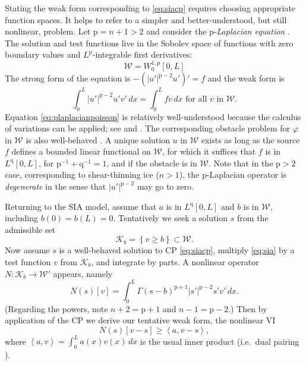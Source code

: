 \documentclass[letterpaper,final,12pt,reqno]{amsart}
\theoremstyle{claim}
\newcommand{\ip}[2]{\left<#1,#2\right>}
\newcommand{\pp}{{\text{p}}}
\newcommand{\qq}{{\text{q}}}
\numberwithin{equation}{section}
\numberwithin{figure}{section}
\numberwithin{table}{section}
\numberwithin{theorem}{section}
\begin{document}
Stating the weak form corresponding to \eqref{eq:siacp} requires choosing appropriate function spaces.  It helps to refer to a simpler and better-understood, but still nonlinear, problem.  Let $\pp=n+1>2$ and consider the $\pp$-\emph{Laplacian equation} \cite{Ciarlet2002,DiBenedetto2012}.  The solution and test functions live in the Sobolev space of functions with zero boundary values and $L^\pp$-integrable first derivatives:
\begin{equation}
\mathcal{W} = W_0^{1,\pp}[0,L]  \label{eq:defineW}
\end{equation}
The strong form of the equation is $-(|u'|^{\pp-2} u')' = f$ and the weak form is
\begin{equation}
\int_0^L |u'|^{\pp-2} u' v'\,dx = \int_0^L f v\,dx \text{ for all $v$ in $\mathcal{W}$.}  \label{eq:plaplacianpoisson}
\end{equation}
Equation \eqref{eq:plaplacianpoisson} is relatively well-understood because the calculus of variations can be applied; see \cite[section 5.3]{Ciarlet2002} and \cite{BarrettLiu1993}.  The corresponding obstacle problem for $\varphi$ in $\mathcal{W}$ is also well-behaved \cite{ChoeLewis1991}.  A unique solution $u$ in $\mathcal{W}$ exists as long as the source $f$ defines a bounded linear functional on $\mathcal{W}$, for which it suffices that $f$ is in $L^\qq[0,L]$, for $\pp^{-1}+\qq^{-1}=1$, and if the obstacle is in $\mathcal{W}$.  Note that in the $\pp>2$ case, corresponding to shear-thinning ice ($n>1$), the $\pp$-Laplacian operator is \emph{degenerate} \cite{DiBenedetto2012} in the sense that $|u'|^{\pp-2}$ may go to zero.

Returning to the SIA model, assume that $a$ is in $L^\qq[0,L]$ and $b$ is in $\mathcal{W}$, including $b(0)=b(L)=0$.  Tentatively we seek a solution $s$ from the admissible set
\begin{equation}
\mathcal{K}_b = \left\{v \ge b\right\} \subset \mathcal{W}.  \label{eq:siaK}
\end{equation}
Now assume $s$ is a well-behaved solution to CP \eqref{eq:siacp}, multiply \eqref{eq:sia} by a test function $v$ from $\mathcal{K}_b$, and integrate by parts.  A nonlinear operator $N:\mathcal{K}_b \to \mathcal{W}'$ appears, namely
\begin{equation}
N(s)[v] = \int_0^L \Gamma (s-b)^{\pp+1} |s'|^{\pp-2} s' v'\,dx. \label{eq:siaNunreg}
\end{equation}
(Regarding the powers, note $n+2=\pp+1$ and $n-1=\pp-2$.)  Then by application of the CP we derive our tentative weak form, the nonlinear VI
\begin{equation}
N(s)[v-s] \ge \ip{a}{v-s}, \label{eq:siaVIunreg}
\end{equation}
where $\ip{a}{v} = \int_0^L a(x) v(x)\,dx$ is the usual inner product (i.e.~dual pairing \cite{KinderlehrerStampacchia1980}).
\end{document}
